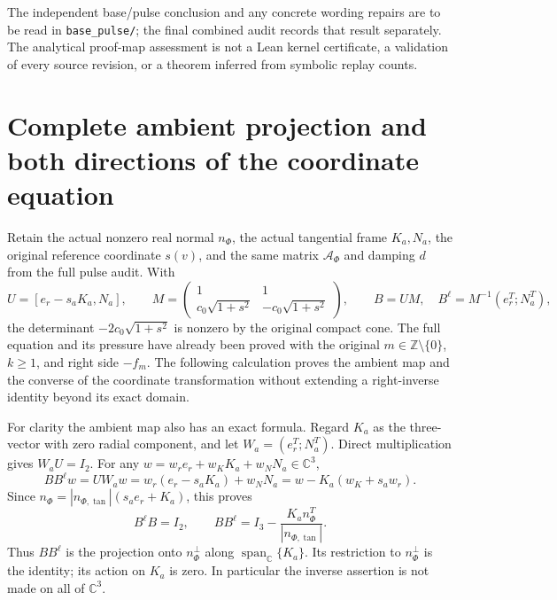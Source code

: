 \documentclass[10pt,a4paper]{article}
\begin{document}
The independent base/pulse conclusion and any concrete wording repairs are to be read in \texttt{base\_pulse/}; the final combined audit records that result separately. The analytical proof-map assessment is not a Lean kernel certificate, a validation of every source revision, or a theorem inferred from symbolic replay counts.

\section{Complete ambient projection and both directions of the coordinate equation}\label{gclosure:complete-ambient-projection-and-both-directions-of-the-coordinate-equation}

Retain the actual nonzero real normal \(n_\Phi\), the actual tangential frame \(K_a,N_a\), the original reference coordinate \(s(v)\), and the same matrix \(\mathcal A_\Phi\) and damping \(d\) from the full pulse audit. With \[
U=[e_r-s_aK_a,N_a],\qquad
M=\begin{pmatrix}1&1\\c_0\sqrt{1+s^2}&-c_0\sqrt{1+s^2}\end{pmatrix},
\qquad B=UM,\quad B^\ell=M^{-1}(e_r^T;N_a^T),
\] the determinant \(-2c_0\sqrt{1+s^2}\) is nonzero by the original compact cone. The full equation and its pressure have already been proved with the original \(m\in\mathbb Z\setminus\{0\}\), \(k\ge1\), and right side \(-f_m\). The following calculation proves the ambient map and the converse of the coordinate transformation without extending a right-inverse identity beyond its exact domain.

For clarity the ambient map also has an exact formula. Regard \(K_a\) as the three-vector with zero radial component, and let \(W_a=(e_r^T;N_a^T)\). Direct multiplication gives \(W_aU=I_2\). For any \(w=w_re_r+w_KK_a+w_NN_a\in\mathbb C^3\), \[
BB^\ell w=UW_aw=w_r(e_r-s_aK_a)+w_NN_a
=w-K_a(w_K+s_aw_r).
\] Since \(n_\Phi=|n_{\Phi,\tan}|(s_ae_r+K_a)\), this proves \[
B^\ell B=I_2,\qquad
BB^\ell=I_3-\frac{K_an_\Phi^T}{|n_{\Phi,\tan}|}.
\] Thus \(BB^\ell\) is the projection onto \(n_\Phi^\perp\) along \(\operatorname{span}_{\mathbb C}\{K_a\}\). Its restriction to \(n_\Phi^\perp\) is the identity; its action on \(K_a\) is zero. In particular the inverse assertion is not made on all of \(\mathbb C^3\).
\end{document}

